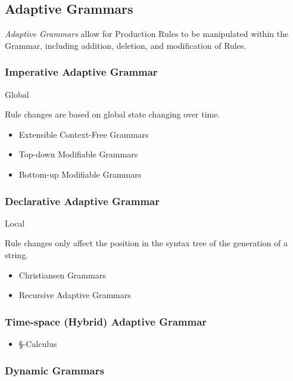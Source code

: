 \documentclass{article}
\begin{document}
\subsection{Adaptive Grammars}

\emph{Adaptive Grammars} allow for Production Rules to be manipulated
within the Grammar, including addition, deletion, and modification of
Rules.

\subsubsection{Imperative Adaptive Grammar}

Global

Rule changes are based on global state changing over time.

\begin{itemize}
\item Extensible Context-Free Grammars
\item Top-down Modifiable Grammars
\item Bottom-up Modifiable Grammars
\end{itemize}

\subsubsection{Declarative Adaptive Grammar}

Local

Rule changes only affect the position in the syntax tree of the
generation of a string.

\begin{itemize}
\item Christiansen Grammars
\item Recursive Adaptive Grammars
\end{itemize}

\subsubsection{Time-space (Hybrid) Adaptive Grammar}

\begin{itemize}
\item \S-Calculus
\end{itemize}

\subsubsection{Dynamic Grammars}
\end{document}
